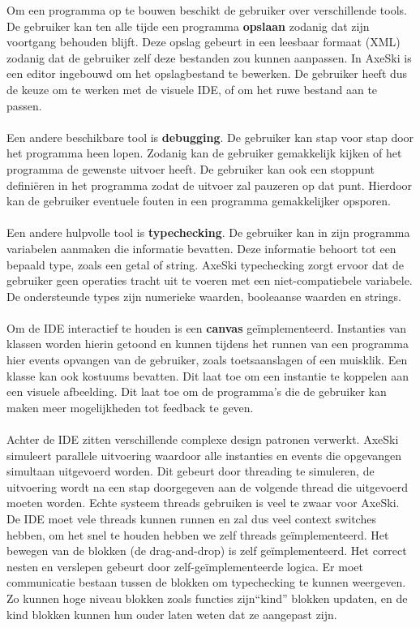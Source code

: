 \documentclass[]{article}
\begin{document}
Om een programma op te bouwen beschikt de gebruiker over verschillende tools. De gebruiker kan ten alle tijde een programma \textbf{opslaan} zodanig dat zijn voortgang behouden blijft. Deze opslag gebeurt in een leesbaar formaat (XML) zodanig dat de gebruiker zelf deze bestanden zou kunnen aanpassen. In AxeSki is een editor ingebouwd om het opslagbestand te bewerken. De gebruiker heeft dus de keuze om te werken met de visuele IDE, of om het ruwe bestand aan te passen.\\\\
Een andere beschikbare tool is \textbf{debugging}. De gebruiker kan stap voor stap door het programma heen lopen. Zodanig kan de gebruiker gemakkelijk kijken of het programma de gewenste uitvoer heeft. De gebruiker kan ook een stoppunt defini\"eren in het programma zodat de uitvoer zal pauzeren op dat punt. Hierdoor kan de gebruiker eventuele fouten in een programma gemakkelijker opsporen.\\\\
Een andere hulpvolle tool is \textbf{typechecking}. De gebruiker kan in zijn programma variabelen aanmaken die informatie bevatten. Deze informatie behoort tot een bepaald type, zoals een getal of string. AxeSki typechecking zorgt ervoor dat de gebruiker geen operaties tracht uit te voeren met een niet-compatiebele variabele. De ondersteunde types zijn numerieke waarden, booleaanse waarden en strings.\\\\
Om de IDE interactief te houden is een \textbf{canvas} ge\"implementeerd. Instanties van klassen worden hierin getoond en kunnen tijdens het runnen van een programma hier events opvangen van de gebruiker, zoals toetsaanslagen of een muisklik. Een klasse kan ook kostuums bevatten. Dit laat toe om een instantie te koppelen aan een visuele afbeelding. Dit laat toe om de programma's die de gebruiker kan maken meer mogelijkheden tot feedback te geven. \\\\
Achter de IDE zitten verschillende complexe design patronen verwerkt. AxeSki simuleert parallele uitvoering waardoor alle instanties en events die opgevangen simultaan uitgevoerd worden. Dit gebeurt door threading te simuleren, de uitvoering wordt na een stap doorgegeven aan de volgende thread die uitgevoerd moeten worden. Echte systeem threads gebruiken is veel te zwaar voor AxeSki. De IDE moet vele threads kunnen runnen en zal dus veel context switches hebben, om het snel te houden hebben we zelf threads ge\"implementeerd. Het bewegen van de blokken (de drag-and-drop) is zelf ge\"implementeerd. Het correct nesten en verslepen gebeurt door zelf-ge\"implementeerde logica. Er moet communicatie bestaan tussen de blokken om typechecking te kunnen weergeven. Zo kunnen hoge niveau blokken zoals functies zijn``kind'' blokken updaten, en de kind blokken kunnen hun ouder laten weten dat ze aangepast zijn. \\\\
\end{document}
